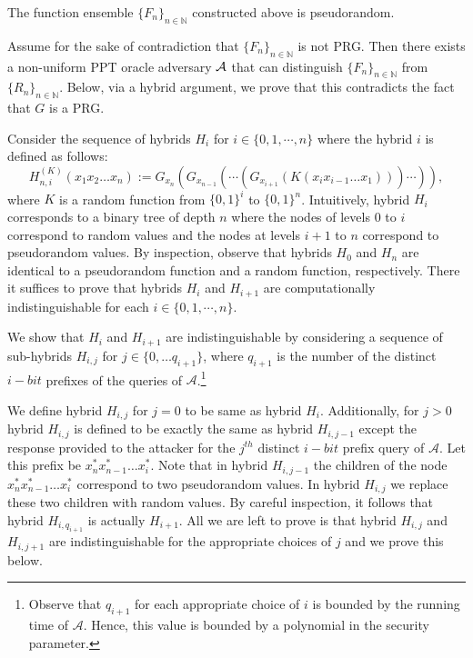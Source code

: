 \begin{theorem}\label{theorem:ggm}
The function ensemble $\{F_n\}_{n \in \mathbb{N}}$ constructed above is pseudorandom.
\end{theorem}

\proof
Assume for the sake of contradiction that $\{F_n\}_{n \in \mathbb{N}}$ is not PRG.
Then there exists a non-uniform PPT oracle adversary $\mathcal{A}$ that can distinguish $\{F_n\}_{n \in \mathbb{N}}$ from $\{R_n\}_{n \in \mathbb{N}}$. Below, via a hybrid argument, we prove that this contradicts the fact that $G$ is a PRG.

Consider the sequence of hybrids $H_i$ for $i \in \{ 0, 1, \cdots, n\}$ where the hybrid $i$ is defined as follows:
\[H_{n,i}^{(K)} (x_1x_2\ldots x_n ):= G_{x_n}(G_{x_{n-1}} (\cdots(G_{x_{i+1}}(K(x_ix_{i-1}\ldots x_1))) \cdots  )), \]
where $K$ is a random function from $\{0,1\}^{i}$ to $\{0,1\}^n$. Intuitively, hybrid $H_i$ corresponds to a binary tree of depth $n$ where the nodes of levels $0$ to $i$ correspond to random values and the nodes at levels $i+1$ to $n$ correspond to pseudorandom values. By inspection, observe that hybrids $H_0$ and $H_n$ are identical to a pseudorandom function and a random function, respectively. There it suffices to prove that hybrids $H_i$ and $H_{i+1}$ are computationally indistinguishable for each $i \in \{ 0, 1, \cdots, n\}$.

We show that $H_{i}$ and $H_{i+1}$ are indistinguishable by considering a sequence of sub-hybrids $H_{i,j}$ for $j \in \{0,\ldots q_{i+1}\}$, where $q_{i+1}$ is the number of the distinct $i-bit$ prefixes of the queries of $\mathcal{A}$.\footnote{Observe that $q_{i+1}$ for each appropriate choice of $i$ is bounded by the running time of $\mathcal{A}$. Hence, this value is bounded by a polynomial in the security parameter.}

We define hybrid $H_{i,j}$ for $j =0$ to be same as hybrid $H_{i}$. Additionally, for $j >0$ hybrid $H_{i,j}$ is defined to be exactly the same as hybrid $H_{i,j-1}$ except the response provided to the attacker for the $j^{th}$ distinct $i-bit$ prefix query of $\mathcal{A}$. Let this prefix be $x^*_n x^*_{n-1} \ldots x^*_{i}$. Note that in hybrid $H_{i,j-1}$ the children of the node $x^*_n x^*_{n-1} \ldots x^*_{i}$ correspond to two pseudorandom values. In hybrid $H_{i,j}$ we replace these two children with random values. By careful inspection, it follows that hybrid $H_{i,q_{i+1}}$ is actually $H_{i+1}$. All we are left to prove is that hybrid $H_{i,j}$ and $H_{i,j+1}$ are indistinguishable for the appropriate choices of $j$ and we prove this below.


